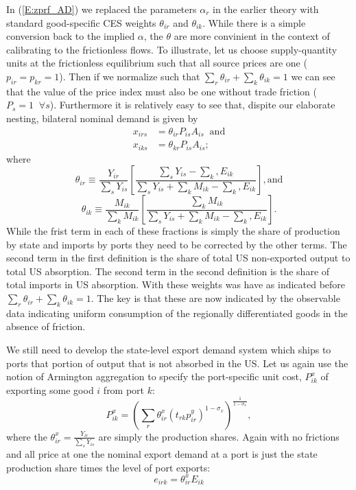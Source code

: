 \documentclass{ejb}
\begin{document}
In (\ref{E:zprf_AD}) we replaced the parameters $\alpha_r$ in the
earlier theory with standard good-specific CES weights $\theta_{ir}$
and $\theta_{ik}$.  While there is a simple conversion back to the
implied $\alpha$, the $\theta$ are more convinient in the context of
calibrating to the frictionless flows. To illustrate, let us choose
supply-quantity units at the frictionless equilibrium such that all
source prices are one ($p_{ir} = p_{kr} =  1$).  Then if we normalize
such that $\sum_r \theta_{ir} + \sum_k \theta_{ik} = 1$ we can see that the
value of the price index must also be one without trade friction
($P_s = 1 \;\; \forall s$).  Furthermore it is relatively easy to see
that, dispite our elaborate nesting, bilateral nominal demand is given
by 
\begin{align}
x_{irs} &= \theta_{ir} P_{is}A_{is} \;\; {\mbox{and}} \\
x_{iks} &= \theta_{kr} P_{is}A_{is}; 
\end{align}
where 
\[
\theta_{ir} \equiv \frac{Y_{ir}}{\sum_s Y_{is}}
		\left[\frac{\sum_s Y_{is}-\sum_k,E_{ik}}{
		\sum_s Y_{is} + \sum_k M_{ik}-\sum_k,E_{ik}}\right], \mbox{and}
\]
\[
\theta_{ik} \equiv\frac{M_{ik}}{\sum_k M_{ik}} \left[
	\frac{\sum_k M_{ik}}{\sum_s Y_{is} + \sum_k M_{ik}-\sum_k,E_{ik}}\right].
\]
While the frist term in each of these fractions is simply the share of
production by state and imports by ports they need to be corrected by
the other terms.  The second term in the first definition is the share
of total US non-exported output to total US absorption.  The second term in the
second definition is the share of total imports in US absorption.
With these weights was have as indicated before $\sum_r \theta_{ir} +
\sum_k \theta_{ik} = 1$.  The key is that these are now indicated by
the observable data indicating uniform consumption of the regionally
differentiated goods in the absence of friction.

We still need to develop the state-level export demand system which
ships to ports that portion of output that is not absorbed in the US.
Let us again use the notion of Armington aggregation to specify the
port-specific unit cost, $P^x_{ik}$ of exporting some good $i$ from port
$k$:
\begin{equation}
\label{E:ExpP}
P^x_{ik} = \left(\sum_r
\theta^x_{ir}(t_{rk}p^y_{ir})^{1-\sigma_x}\right)^{\frac{1}{1-\sigma_x}},
\end{equation}   
where the $\theta^x_{ir} = \frac{Y_{ir}}{\sum_s Y_{is}}$ are simply
the production shares.  Again with no frictions and all price at one
the nominal export demand at a port is just the state production share
times the level of port exports:
\begin{equation}
e_{irk} = \theta^x_{ir} E_{ik}
\end{equation}
\end{document}
